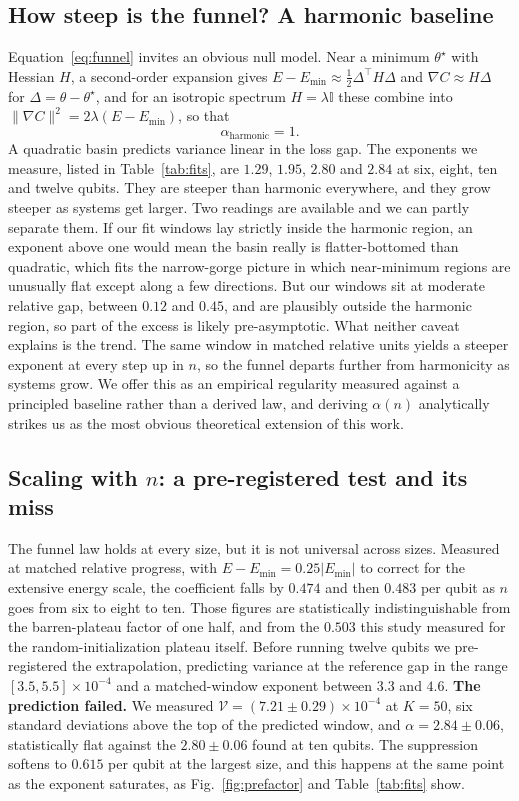 \documentclass[conference]{IEEEtran}%
\newcommand{\gap}{\ensuremath{E-E_{\min}}}
\begin{document}
\subsection{How steep is the funnel? A harmonic baseline}
Equation~\eqref{eq:funnel} invites an obvious null model. Near a minimum $\theta^\star$ with Hessian $H$, a second-order expansion gives $\gap\approx\frac12\Delta^\top H\Delta$ and $\nabla C\approx H\Delta$ for $\Delta=\theta-\theta^\star$, and for an isotropic spectrum $H=\lambda\mathbb{I}$ these combine into $\lVert\nabla C\rVert^2=2\lambda(\gap)$, so that
\begin{equation}
\alpha_{\text{harmonic}}=1 .
\label{eq:harmonic}
\end{equation}
A quadratic basin predicts variance linear in the loss gap. The exponents we measure, listed in Table~\ref{tab:fits}, are $1.29$, $1.95$, $2.80$ and $2.84$ at six, eight, ten and twelve qubits. They are steeper than harmonic everywhere, and they grow steeper as systems get larger. Two readings are available and we can partly separate them. If our fit windows lay strictly inside the harmonic region, an exponent above one would mean the basin really is flatter-bottomed than quadratic, which fits the narrow-gorge picture \cite{arrasmith} in which near-minimum regions are unusually flat except along a few directions. But our windows sit at moderate relative gap, between $0.12$ and $0.45$, and are plausibly outside the harmonic region, so part of the excess is likely pre-asymptotic. What neither caveat explains is the trend. The same window in matched relative units yields a steeper exponent at every step up in $n$, so the funnel departs further from harmonicity as systems grow. We offer this as an empirical regularity measured against a principled baseline rather than a derived law, and deriving $\alpha(n)$ analytically strikes us as the most obvious theoretical extension of this work.

\subsection{Scaling with $n$: a pre-registered test and its miss}\label{sec:scaling}
The funnel law holds at every size, but it is not universal across sizes. Measured at matched relative progress, with $\gap=0.25\lvert E_{\min}\rvert$ to correct for the extensive energy scale, the coefficient falls by $0.474$ and then $0.483$ per qubit as $n$ goes from six to eight to ten. Those figures are statistically indistinguishable from the barren-plateau factor of one half, and from the $0.503$ this study measured for the random-initialization plateau itself. Before running twelve qubits we pre-registered the extrapolation, predicting variance at the reference gap in the range $[3.5,5.5]\times10^{-4}$ and a matched-window exponent between $3.3$ and $4.6$. \textbf{The prediction failed.} We measured $\mathcal V=(7.21\pm0.29)\times10^{-4}$ at $K{=}50$, six standard deviations above the top of the predicted window, and $\alpha=2.84\pm0.06$, statistically flat against the $2.80\pm0.06$ found at ten qubits. The suppression softens to $0.615$ per qubit at the largest size, and this happens at the same point as the exponent saturates, as Fig.~\ref{fig:prefactor} and Table~\ref{tab:fits} show.
\end{document}
